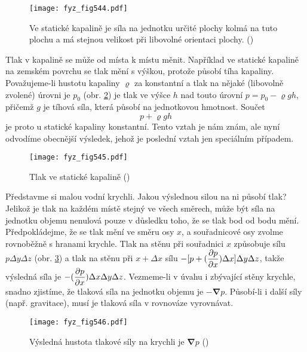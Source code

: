 {    \begin{figure}[ht!] %
      \centering
      \texttt{[image: fyz\_fig544.pdf]}
      \caption{Ve statické kapalině je síla na jednotku určité plochy kolmá na tuto plochu a má 
               stejnou velikost při libovolné orientaci plochy. 
               (\cite[s.~741]{Feynman02})}
      \label{fyz_fig544}
    \end{figure}

    Tlak v kapalině se může od místa k místu měnit. Například ve statické kapalině na zemském 
    povrchu se tlak mění s výškou, protože působí tíha kapaliny. Považujeme-li hustotu kapaliny 
    \(\varrho\) za konstantní a tlak na nějaké (libovolně zvolené) úrovni je \(p_0\) (obr. 
    \ref{fyz_fig545}) je tlak ve výšce \(h\) nad touto úrovní \(p=p_0 - \varrho gh\), přičemž \(g\) 
    je tíhová síla, která působí na jednotkovou hmotnost. Součet
    \begin{equation*}
      p + \varrho gh
    \end{equation*}
    je proto u statické kapaliny konstantní. Tento vztah je nám znám, ale nyní odvodíme obecnější 
    výsledek, jehož je poslední vztah jen speciálním případem.
    
    \begin{figure}[ht!] %
      \centering
      \texttt{[image: fyz\_fig545.pdf]}
      \caption{Tlak ve statické kapalině
               (\cite[s.~741]{Feynman02})}
      \label{fyz_fig545}
    \end{figure}
    
    Představme si malou vodní krychli. Jakou výslednou silou na ni působí tlak? Jelikož je tlak na 
    každém místě stejný ve všech směrech, může být síla na jednotku objemu nenulová pouze v 
    důsledku toho, že se tlak bod od bodu mění. Předpokládejme, že se tlak mění ve směru osy \(x\), 
    a souřadnicové osy zvolme rovnoběžně s hranami krychle. Tlak na stěnu při souřadnici \(x\) 
    způsobuje sílu \(p\Delta y\Delta z\) (obr. \ref{fyz_fig546}) a tlak na stěnu při \(x + \Delta 
    x\) sílu \(-[p + (\dfrac{\partial p}{\partial x})\Delta x]\Delta y \Delta z\), takže výsledná síla je 
    \(-(\dfrac{\partial p}{\partial x})\Delta x\Delta y\Delta z\). Vezmeme-li v úvahu i zbývající stěny krychle, 
    snadno zjistíme, že tlaková síla na jednotku objemu je \(-\symbf{\nabla}p\). Působí-li i další 
    síly (např. gravitace), musí je tlaková síla v rovnováze vyrovnávat.

    \begin{figure}[ht!] %
      \centering
      \texttt{[image: fyz\_fig546.pdf]}
      \caption{Výsledná hustota tlakové síly na krychli je \(\symbf{\nabla} p\)
               (\cite[s.~742]{Feynman02})}
      \label{fyz_fig546}
    \end{figure}
    
}
